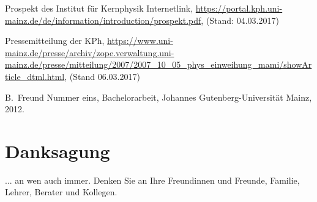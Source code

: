 \documentclass[a4paper,11pt,oneside,final,german,openbib,pdftex]{scrbook}
\begin{document}
\begin{appendix}
\begin{thebibliography}{99}
 Prospekt des Institut für Kernphysik Internetlink, \url{https://portal.kph.uni-mainz.de/de/information/introduction/prospekt.pdf}, (Stand: 04.03.2017)

 Pressemitteilung der KPh, \url{https://www.uni-mainz.de/presse/archiv/zope.verwaltung.uni-mainz.de/presse/mitteilung/2007/2007_10_05_phys_einweihung_mami/showArticle_dtml.html}, (Stand 06.03.2017)












  B.~Freund Nummer eins, 
  Bachelorarbeit, Johannes Gutenberg-Universit\"at Mainz, 2012.

\end{thebibliography}

\chapter{Danksagung}

... an wen auch immer. Denken Sie an Ihre Freundinnen und Freunde, 
Familie, Lehrer, Berater und Kollegen.

\end{appendix}
\end{document}
